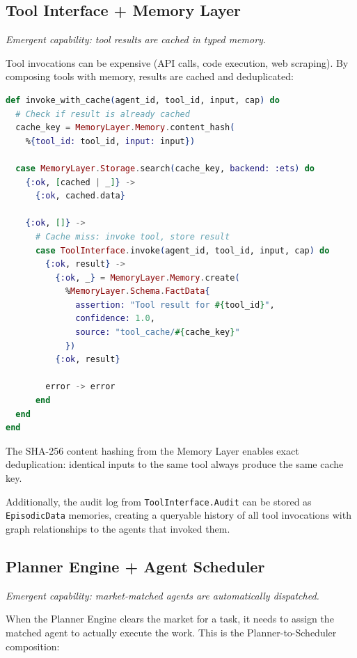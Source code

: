 \documentclass[12pt,a4paper]{article}
\theoremstyle{definition}
\begin{document}
\subsection{Tool Interface + Memory Layer}\label{subsec:tool-memory}

\emph{Emergent capability: tool results are cached in typed memory.}

Tool invocations can be expensive (API calls, code execution, web scraping).
By composing tools with memory, results are cached and deduplicated:

\begin{lstlisting}[language=elixir, caption={Tool result caching via memory}]
def invoke_with_cache(agent_id, tool_id, input, cap) do
  # Check if result is already cached
  cache_key = MemoryLayer.Memory.content_hash(
    %{tool_id: tool_id, input: input})

  case MemoryLayer.Storage.search(cache_key, backend: :ets) do
    {:ok, [cached | _]} ->
      {:ok, cached.data}

    {:ok, []} ->
      # Cache miss: invoke tool, store result
      case ToolInterface.invoke(agent_id, tool_id, input, cap) do
        {:ok, result} ->
          {:ok, _} = MemoryLayer.Memory.create(
            %MemoryLayer.Schema.FactData{
              assertion: "Tool result for #{tool_id}",
              confidence: 1.0,
              source: "tool_cache/#{cache_key}"
            })
          {:ok, result}

        error -> error
      end
  end
end
\end{lstlisting}

The SHA-256 content hashing from the Memory Layer enables exact deduplication:
identical inputs to the same tool always produce the same cache key.

Additionally, the audit log from \texttt{ToolInterface.Audit} can be
stored as \texttt{EpisodicData} memories, creating a queryable history of
all tool invocations with graph relationships to the agents that invoked them.

\subsection{Planner Engine + Agent Scheduler}\label{subsec:planner-scheduler}

\emph{Emergent capability: market-matched agents are automatically dispatched.}

When the Planner Engine clears the market for a task, it needs to assign the
matched agent to actually execute the work. This is the Planner-to-Scheduler
composition:
\end{document}
